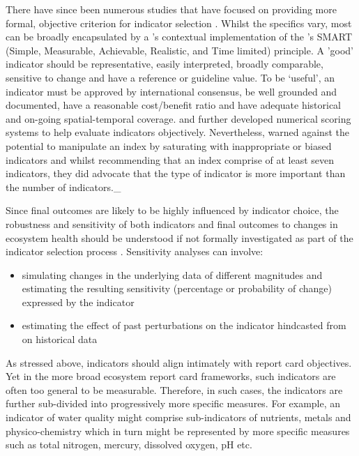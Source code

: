 There have since been numerous studies that have focused on providing more formal, objective
criterion for indicator selection \citep{Dauvin-2008, Emerson-2012, Flint-2012, James-2012}.  Whilst
the specifics vary, most can be broadly encapsulated by a \citet{Dauvin-2008}'s contextual
implementation of the \citet{Doran-1981}'s SMART (Simple, Measurable, Achievable, Realistic, and
Time limited) principle.  A 'good' indicator should be representative, easily interpreted, broadly
comparable, sensitive to change and have a reference or guideline value.  To be `useful', an
indicator must be approved by international consensus, be well grounded and documented, have a
reasonable cost/benefit ratio and have adequate historical and on-going spatial-temporal coverage.
\citet{Flint-2012} and \citet{James-2012} further developed numerical scoring systems to help
evaluate indicators objectively.  Nevertheless, \citep{Neary-2012} warned against the potential to
manipulate an index by saturating with inappropriate or biased indicators and whilst recommending
that an index comprise of at least seven indicators, they did advocate that the type of indicator is
more important than the number of indicators._

Since final outcomes are likely to be highly influenced by indicator choice, the robustness and
sensitivity of both indicators and final outcomes to changes in ecosystem health should be
understood if not formally investigated as part of the indicator selection process
\citep{Dobbie-2013}.  Sensitivity analyses can involve:

\begin{itemize}
\item simulating changes in the underlying data of different magnitudes and estimating the resulting
sensitivity (percentage or probability of change) expressed by the indicator
\item estimating the effect of past perturbations on the indicator hindcasted from on historical
data
\end{itemize}

As stressed above, indicators should align intimately with report card objectives.  Yet in the more
broad ecosystem report card frameworks, such indicators are often too general to be measurable.
Therefore, in such cases, the indicators are further sub-divided into progressively more specific
measures.  For example, an indicator of water quality might comprise sub-indicators of nutrients,
metals and physico-chemistry which in turn might be represented by more specific measures such as
total nitrogen, mercury, dissolved oxygen, pH etc.

